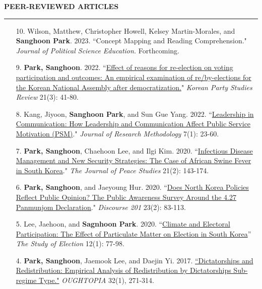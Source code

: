 \documentclass[
  16,
]{article}
\begin{document}
\begin{large}{\bf PEER-REVIEWED ARTICLES}
  \vspace{3pt}
  \hrule
\end{large}
  \begin{itemize}
    \item[10.] Wilson, Matthew, Christopher Howell, Kelsey Martin-Morales, and \textbf{Sanghoon Park}. 2023. ``Concept Mapping and Reading Comprehension." \textit{Journal of Political Science Education.} Forthcoming.
    \item[9.] \textbf{Park, Sanghoon}. 2022. ``\href{http://www.partystudies.or.kr/contents/bbs/bbs_list.html?bbs_cls_cd=004003}{Effect of reasons for re-election on voting participation and outcomes: An empirical examination of re/by-elections for the Korean National Assembly after democratization.}"  \textit{Korean Party Studies Review} 21(3): 41-80. 
\item[8.] Kang, Jiyoon, \textbf{Sanghoon Park}, and Sun Gue Yang. 2022. ``\href{http://basicdata.kr/board/read/journals/146/}{Leadership in Communication:
How Leadership and Communication Affect Public Service Motivation (PSM)}." \textit{Journal of Research Methodology} 7(1): 23-60.
\item[7.] \textbf{Park, Sanghoon}, Chaehoon Lee, and Ilgi Kim. 2020. ``\href{https://www.earticle.net/Journal/Issues/511/28448}{Infectious Disease Management and New Security Strategies: The Case of African Swine Fever in South Korea}." \textit{The Journal of Peace Studies} 21(2): 143-174.
\item[6.] \textbf{Park, Sanghoon}, and Jaeyoung Hur. 2020. ``\href{http://www.discourse201.org/html/sub05_01.asp}{Does North Korea Policies Reflect Public Opinion? The Public Awareness Survey Around the 4.27 Panmunjom Declaration}." \textit{Discourse 201} 23(2): 83-113.
\item[5.] Lee, Jaehoon, and \textbf{Sagnhoon Park}. 2020. ``\href{https://m.nec.go.kr/portal/cmm/fms/FileDown.do?atchFileId=5d0ffae936edc42f3b4e864801f86a0f4096c44da03fede418b94067e8f9d0ea&fileSn=1&bbsId=&searchYear=}{Climate and Electoral Participation: The Effect of Particulate Matter on Election in South Korea}'' \textit{The Study of Election} 12(1): 77-98.  
\item[4.] \textbf{Park, Sanghoon}, Jaemook Lee, and Daejin Yi. 2017. \href{http://www.dbpia.co.kr/Journal/ArticleDetail/NODE07183479?TotalCount=1&Seq=1&q=%5B%EB%8F%85%EC%9E%AC%EA%B5%AD%EA%B0%80%EC%99%80%20%EC%9E%AC%EB%B6%84%EB%B0%B0%C2%A7coldb%C2%A72%C2%A751%C2%A73%5D&searchWord=%EC%A0%84%EC%B2%B4%3D%5E%24%EB%8F%85%EC%9E%AC%EA%B5%AD%EA%B0%80%EC%99%80%20%EC%9E%AC%EB%B6%84%EB%B0%B0%5E*&Multimedia=0&isIdentifyAuthor=0&Collection=0&SearchAll=%EB%8F%85%EC%9E%AC%EA%B5%AD%EA%B0%80%EC%99%80%20%EC%9E%AC%EB%B6%84%EB%B0%B0&isFullText=0&specificParam=0&SearchMethod=0&Sort=1&SortType=desc&Page=1&PageSize=20#}{``Dictatorships and Redistribution: Empirical Analysis of Redistribution by Dictatorships Sub-regime Type."} \textit{OUGHTOPIA} 32(1), 271-314.

\end{itemize}
\end{document}
